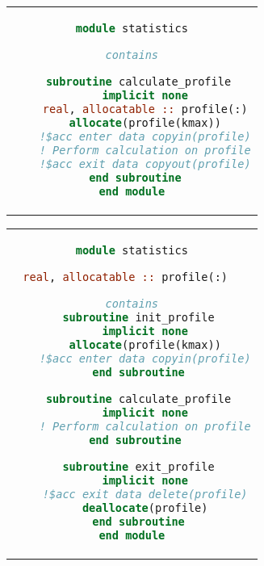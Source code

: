 \begin{figure}[H]
  \centering
  \label{lst:memory_allocation}
  \begin{adjustbox}{valign=t, minipage=0.48\linewidth}
    \centering
    \begin{tabular}{c}
      \begin{lstlisting}[language=Fortran]
module statistics

contains

  subroutine calculate_profile
    implicit none
    real, allocatable :: profile(:)
    allocate(profile(kmax))
    !$acc enter data copyin(profile)
    ! Perform calculation on profile
    !$acc exit data copyout(profile)
  end subroutine 
end module
      \end{lstlisting}
    \end{tabular}
  \end{adjustbox}
  \hfill
  \begin{adjustbox}{valign=t, minipage=0.48\linewidth}
    \centering
    \begin{tabular}{c}
      \begin{lstlisting}[language=Fortran]
module statistics

real, allocatable :: profile(:)  

contains
  subroutine init_profile
    implicit none
    allocate(profile(kmax))
    !$acc enter data copyin(profile)
  end subroutine

  subroutine calculate_profile
    implicit none
    ! Perform calculation on profile
  end subroutine 

  subroutine exit_profile
    implicit none
    !$acc exit data delete(profile)
    deallocate(profile)
  end subroutine
end module
      \end{lstlisting}
    \end{tabular}
  \end{adjustbox}
\end{figure}

